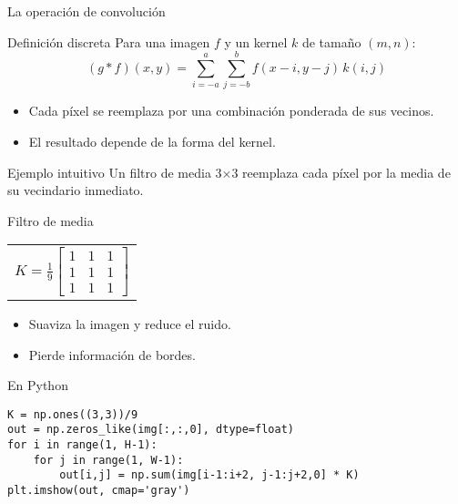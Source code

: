 \documentclass[10pt]{beamer}
\begin{document}
\begin{frame}{La operaci\'on de convoluci\'on}
\begin{block}{Definici\'on discreta}
Para una imagen $f$ y un kernel $k$ de tama\~no $(m,n)$:
\[
(g*f)(x,y) = \sum_{i=-a}^{a} \sum_{j=-b}^{b} f(x-i, y-j)\,k(i,j)
\]
\end{block}
\begin{itemize}
  \item Cada p\'ixel se reemplaza por una combinaci\'on ponderada de sus vecinos.
  \item El resultado depende de la forma del kernel.
\end{itemize}
\vspace{2mm}
\begin{block}{Ejemplo intuitivo}
Un filtro de media 3$\times$3 reemplaza cada p\'ixel por la media de su vecindario inmediato.
\end{block}
\end{frame}

\begin{frame}[fragile]{Filtro de media}
\centering
\begin{tabular}{c}
$\displaystyle K = \frac{1}{9}\begin{bmatrix}1 & 1 & 1\\ 1 & 1 & 1\\ 1 & 1 & 1\end{bmatrix}$
\end{tabular}
\vspace{3mm}
\begin{itemize}
  \item Suaviza la imagen y reduce el ruido.
  \item Pierde informaci\'on de bordes.
\end{itemize}
\vspace{2mm}
\begin{block}{En Python}
\scriptsize
\begin{verbatim}
K = np.ones((3,3))/9
out = np.zeros_like(img[:,:,0], dtype=float)
for i in range(1, H-1):
    for j in range(1, W-1):
        out[i,j] = np.sum(img[i-1:i+2, j-1:j+2,0] * K)
plt.imshow(out, cmap='gray')
\end{verbatim}
\end{block}
\end{frame}
\end{document}

